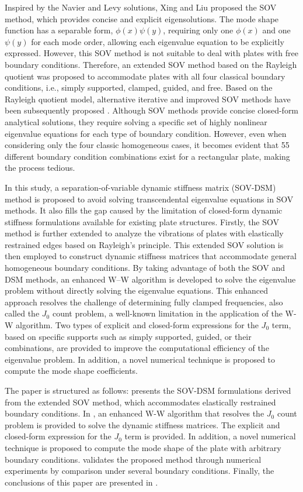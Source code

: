 \documentclass[preprint,12pt,number]{elsarticle}
\begin{document}
Inspired by the Navier and Levy solutions, Xing and Liu \cite{xing2009new} proposed the SOV method, which provides concise and explicit eigensolutions.
The mode shape function has a separable form, $\phi(x) \psi(y)$, requiring only one $\phi(x)$ and one $\psi(y)$ for each mode order, allowing each eigenvalue equation to be explicitly expressed.
However, this SOV method is not suitable to deal with plates with free boundary conditions.
Therefore, an extended SOV method \cite{xing2018overall, xing2020extended} based on the Rayleigh quotient was proposed to accommodate plates with all four classical boundary conditions, i.e., simply supported, clamped, guided, and free.
Based on the Rayleigh quotient model, alternative iterative and improved SOV methods have been subsequently proposed \cite{xing2020improved}.
Although SOV methods provide concise closed-form analytical solutions, they require solving a specific set of highly nonlinear eigenvalue equations for each type of boundary condition.
However, even when considering only the four classic homogeneous cases, it becomes evident that 55 different boundary condition combinations exist for a rectangular plate, making the process tedious.

In this study, a separation-of-variable dynamic stiffness matrix (SOV-DSM) method is proposed to avoid solving transcendental eigenvalue equations in SOV methods.
It also fills the gap caused by the limitation of closed-form dynamic stiffness formulations available for existing plate structures.
Firstly, the SOV method is further extended to analyze the vibrations of plates with elastically restrained edges based on Rayleigh’s principle. 
This extended SOV solution is then employed to construct dynamic stiffness matrices that accommodate general homogeneous boundary conditions.
By taking advantage of both the SOV and DSM methods, an enhanced W–W algorithm is developed to solve the eigenvalue problem without directly solving the eigenvalue equations.
This enhanced approach resolves the challenge of determining fully clamped frequencies, also called the $J_0$ count problem, a well-known limitation in the application of the W-W algorithm. 
Two types of explicit and closed-form expressions for the $J_0$ term, based on specific supports such as simply supported, guided, or their combinations, are provided to improve the computational efficiency of the eigenvalue problem.
In addition, a novel numerical technique is proposed to compute the mode shape coefficients. 

The paper is structured as follows:  presents the SOV-DSM formulations derived from the extended SOV method, which accommodates elastically restrained boundary conditions.
In , an enhanced W-W algorithm that resolves the $J_0$ count problem is provided to solve the dynamic stiffness matrices. 
The explicit and closed-form expression for the $J_0$ term is provided. 
In addition, a novel numerical technique is proposed to compute the mode shape of the plate with arbitrary boundary conditions.
 validates the proposed method through numerical experiments by comparison under several boundary conditions.
Finally, the conclusions of this paper are presented in .
\end{document}
